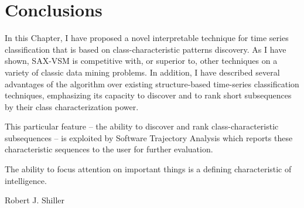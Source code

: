 \section{Conclusions} \label{conclusion}
In this Chapter, I have proposed a novel interpretable technique for time series classification that 
is based on class-characteristic patterns discovery. As I have shown, SAX-VSM is competitive with, or 
superior to, other techniques on a variety of classic data mining problems. 
In addition, I have described several advantages of the algorithm over existing structure-based time-series 
classification techniques, emphasizing its capacity to discover and to rank short subsequences by their 
class characterization power.

This particular feature -- the ability to discover and rank class-characteristic subsequences -- 
is exploited by Software Trajectory Analysis which reports these characteristic sequences to the user for 
further evaluation.

\epigraph{The ability to focus attention on important things is a defining characteristic of 
intelligence.}{Robert J. Shiller}
